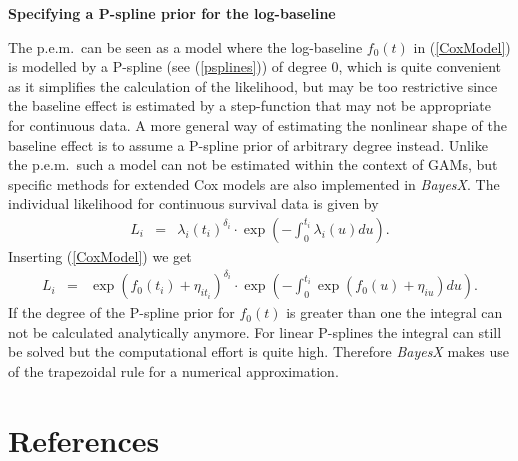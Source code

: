 \documentclass[11pt,a4paper,twoside]{bayesxarticle}
\begin{document}
\textbf{Specifying a P-spline prior for the log-baseline}

The p.e.m.~can be seen as a model where the log-baseline $f_0(t)$
in (\ref{CoxModel}) is modelled by a P-spline (see
(\ref{psplines})) of degree 0, which is quite convenient as it
simplifies the calculation of the likelihood, but may be too
restrictive since the baseline effect is estimated by a
step-function that may not be appropriate for continuous data. A
more general way of estimating the nonlinear shape of the baseline
effect is to assume a P-spline prior of arbitrary degree instead.
Unlike the p.e.m.~such a model can not be estimated within the
context of GAMs, but specific methods for extended Cox models are
also implemented in {\it BayesX}. The individual likelihood for
continuous survival data is given by
\begin{eqnarray}\nonumber
L_i &=&\lambda_i(t_i)^{\delta_i}\cdot
\exp\left(-\int_{0}^{t_i}\lambda_i(u)du\right).
\end{eqnarray}
Inserting (\ref{CoxModel}) we get
\begin{eqnarray}\nonumber
L_i &=&\exp(f_0(t_i)+\eta_{i t_i})^{\delta_i}\cdot
\exp\left(-\int_{0}^{t_i}\exp(f_0(u)+\eta_{iu})du\right).
\end{eqnarray}
If the degree of the P-spline prior for $f_0(t)$ is greater than
one the integral can not be calculated analytically anymore. For
linear P-splines the integral can still be solved but the
computational effort is quite high. Therefore {\it BayesX} makes
use of the trapezoidal rule for a numerical approximation.

\section{References}
\label{bayesregref}
\end{document}
